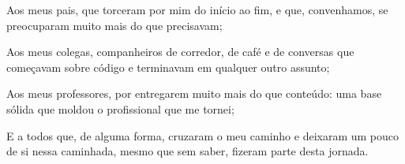 \documentclass[
	12pt,			%
	openany,		%
	oneside,		%
	a4paper,		%
	english,		%
	brazil			%
	]{abntex2}
\begin{document}

\frenchspacing  %


\imprimircapa

\imprimirfolhaderosto  %

%
%     


% 


\begin{agradecimentos}
  Aos meus pais, que torceram por mim do início ao fim,
  e que, convenhamos, se preocuparam muito mais do que precisavam;

  Aos meus colegas, companheiros de corredor, de café
  e de conversas que começavam sobre código e terminavam em qualquer outro assunto;

  Aos meus professores, por entregarem muito mais do que conteúdo:
  uma base sólida que moldou o profissional que me tornei;

  E a todos que, de alguma forma, cruzaram o meu caminho
  e deixaram um pouco de si nessa caminhada,
  mesmo que sem saber, fizeram parte desta jornada.
\end{agradecimentos}
\end{document}
